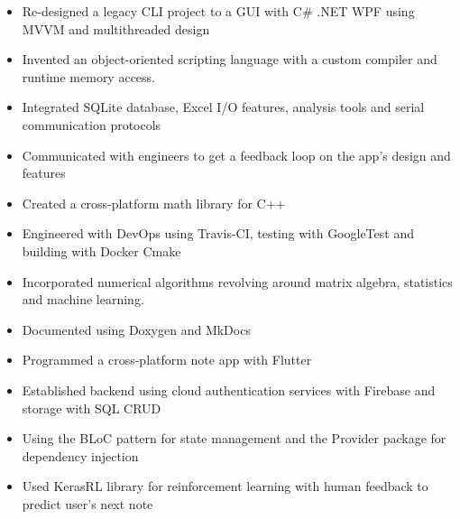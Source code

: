 \documentclass[11pt,a4paper,ragged2e]{altacv}
\begin{document}
\begin{paracol}{1}


{}

\begin{itemize}
\item Re-designed a legacy CLI project to a GUI with C\# .NET WPF using MVVM and multithreaded design
\item Invented an object-oriented scripting language with a custom compiler and runtime memory access.
\item Integrated SQLite database, Excel I/O features, analysis tools and serial communication protocols 
\item Communicated with engineers to get a feedback loop on the app's design and features
\end{itemize}

\tightdivider
{}
\begin{itemize}
\item Created a cross-platform math library for C++ 
\item Engineered with DevOps using Travis-CI, testing with GoogleTest and building with Docker Cmake
\item Incorporated numerical algorithms revolving around matrix algebra, statistics and machine learning.
\item Documented using Doxygen and MkDocs
\end{itemize}
\tightdivider


\begin{itemize}
\item Programmed a cross-platform note app with Flutter
\item Established backend using cloud authentication services with Firebase and storage with SQL CRUD 
\item Using the BLoC pattern for state management and the Provider package for dependency injection
\item Used KerasRL library for reinforcement learning with human feedback to predict user's next note
\end{itemize}
\tightdivider


\end{paracol}
\end{document}

